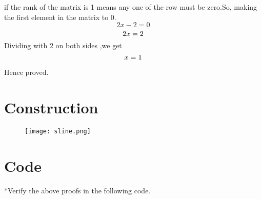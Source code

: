 \documentclass[10pt, a4paper]{article}
\begin{document}
if the rank of the matrix is 1 means any one of the row must be zero.So, making the first element in the matrix to 0.\\
\begin{equation}\label{eq:}
2x-2=0
\end{equation} 
\begin{equation}\label{eq:}
2x=2\\
\end{equation} 
Dividing  with 2 on both sides ,we get\\


\begin{equation}\label{eq:}
x=1 \\
\end{equation} 

Hence proved.\\
\section{Construction}
 \begin{figure}[h]
\centering
\texttt{[image: sline.png]} 
\caption{}
\end{figure}
\section{Code}
*Verify the above proofs in the following code.\\

\end{document}

